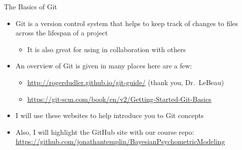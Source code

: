 \documentclass[ignorenonframetext,]{beamer}
\providecommand{\tightlist}{%
  \setlength{\itemsep}{0pt}\setlength{\parskip}{0pt}}
\begin{document}
\begin{frame}{The Basics of Git}

\begin{itemize}
\tightlist
\item
  Git is a version control system that helps to keep track of changes to
  files across the lifespan of a project

  \begin{itemize}
  \tightlist
  \item
    It is also great for using in collaboration with others
  \end{itemize}
\item
  An overview of Git is given in many places here are a few:

  \begin{itemize}
  \tightlist
  \item
    \url{http://rogerdudler.github.io/git-guide/} (thank you,
    Dr.~LeBeau)
  \item
    \url{https://git-scm.com/book/en/v2/Getting-Started-Git-Basics}
  \end{itemize}
\item
  I will use these websites to help introduce you to Git concepts
\item
  Also, I will highlight the GitHub site with our course repo:
  \url{https://github.com/jonathantemplin/BayesianPsychometricModeling}
\end{itemize}

\end{frame}
\end{document}
